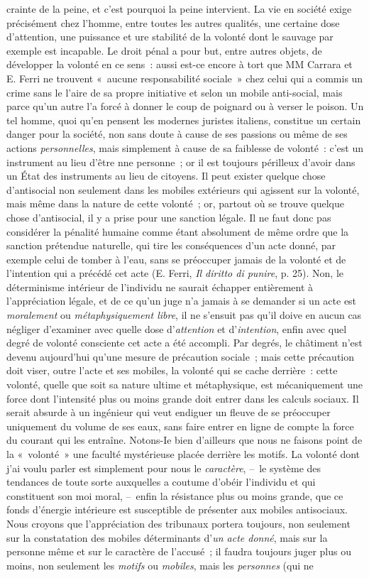 \documentclass[french,twoside]{book} %
\begin{document}
crainte de la peine, et c’est pourquoi la peine intervient. La vie en société exige précisément chez l’homme, entre toutes les autres qualités, une certaine dose d’attention, une puissance et ure stabilité de la volonté dont le sauvage par exemple est incapable. Le droit pénal a pour but, entre autres objets, de développer la volonté en ce sens : aussi est-ce encore à tort que MM Carrara et E. Ferri ne trouvent « aucune responsabilité sociale » chez celui qui a commis un crime sans le l’aire de sa propre initiative et selon un mobile anti-social, mais parce qu’un autre l’a forcé à donner le coup de poignard ou à verser le poison. Un tel homme, quoi qu’en pensent les modernes juristes italiens, constitue un certain danger pour la société, non sans doute à cause de ses passions ou même de ses actions \emph{personnelles}, mais simplement à cause de sa faiblesse de volonté : c’est un instrument au lieu d’être nne personne ; or il est toujours périlleux d’avoir dans un État des instruments au lieu de citoyens. Il peut exister quelque chose d’antisocial non seulement dans les mobiles extérieurs qui agissent sur la volonté, mais même dans la nature de cette volonté ; or, partout où se trouve quelque chose d’antisocial, il y a prise pour une sanction légale. Il ne faut donc pas considérer la pénalité humaine comme étant absolument de même ordre que la sanction prétendue naturelle, qui tire les conséquences d’un acte donné, par exemple celui de tomber à l’eau, sans se préoccuper jamais de la volonté et de l’intention qui a précédé cet acte (E. Ferri, \emph{Il diritto di punire}, p. 25). Non, le déterminisme intérieur de l’individu ne saurait échapper entièrement à l’appréciation légale, et de ce qu’un juge n’a jamais à se demander si un acte est \emph{moralement} ou \emph{métaphysiquement libre}, il ne s’ensuit pas qu’il doive en aucun cas négliger d’examiner avec quelle dose d’\emph{attention} et d’\emph{intention}, enfin avec quel degré de volonté consciente cet acte a été accompli. Par degrés, le châtiment n’est devenu aujourd’hui qu’une mesure de précaution sociale ; mais cette précaution doit viser, outre l’acte et ses mobiles, la volonté qui se cache derrière : cette volonté, quelle que soit sa nature ultime et métaphysique, est mécaniquement une force dont l’intensité plus ou moins grande doit entrer dans les calculs sociaux. Il serait absurde à un ingénieur qui veut endiguer un fleuve de se préoccuper uniquement du volume de ses eaux, sans faire entrer en ligne de compte la force du courant qui les entraîne. Notons-Ie bien d’ailleurs que nous ne faisons point de la « volonté » une faculté mystérieuse placée derrière les motifs. La volonté dont j’ai voulu parler est simplement pour nous le \emph{caractère}, – le système des tendances de toute sorte auxquelles a coutume d’obéir l’individu et qui constituent son moi moral, – enfin la résistance plus ou moins grande, que ce fonds d’énergie intérieure est susceptible de présenter aux mobiles antisociaux. Nous croyons que l’appréciation des tribunaux portera toujours, non seulement sur la constatation des mobiles déterminants d’\emph{un acte donné}, mais sur la personne même et sur le caractère de l’accusé ; il faudra toujours juger plus ou moins, non seulement les \emph{motifs} ou \emph{mobiles}, mais les \emph{personnes} (qui ne 
\end{document}
